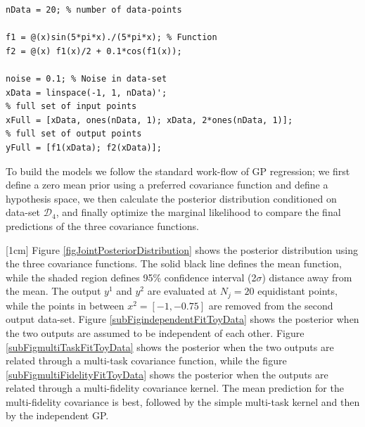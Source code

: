 \begin{mdframed}[hidealllines=true,backgroundcolor=lightgray!20]
\begin{lstlisting}[caption={Code for data-set D4}, 
                    captionpos=b,
                    label={codeDatasetD4},
                    style=Matlab-editor, 
                    basicstyle=\color{black}\ttfamily\small,
                    backgroundcolor = \color{MatlabCellColour}]
nData = 20; % number of data-points

f1 = @(x)sin(5*pi*x)./(5*pi*x); % Function
f2 = @(x) f1(x)/2 + 0.1*cos(f1(x));

noise = 0.1; % Noise in data-set
xData = linspace(-1, 1, nData)';
% full set of input points
xFull = [xData, ones(nData, 1); xData, 2*ones(nData, 1)]; 
% full set of output points
yFull = [f1(xData); f2(xData)];
\end{lstlisting}
\end{mdframed}

\begin{mdframed}[hidealllines=true,backgroundcolor=lightgray!20]
To build the models we follow the standard work-flow of GP regression; we first define a zero mean prior using a preferred covariance function and define a hypothesis space, we then calculate the posterior distribution conditioned on data-set $\mathcal{D}_{4}$, and finally optimize the marginal likelihood to compare the final predictions of the three covariance functions. 

[1cm]
Figure \ref{figJointPosteriorDistribution} shows the posterior distribution using the three covariance functions. The solid black line defines the mean function, while the shaded region defines 95\% confidence interval (2$\sigma$) distance away from the mean. The output $y^{1}$ and $y^2$ are evaluated at $N_{j}=20$ equidistant points, while the points in between $x^2 = [-1, -0.75]$ are removed from the second output data-set. Figure \ref{subFigindependentFitToyData} shows the posterior when the two outputs are assumed to be independent of each other. Figure \ref{subFigmultiTaskFitToyData} shows the posterior when the two outputs are related through a multi-task covariance function, while the figure \ref{subFigmultiFidelityFitToyData} shows the posterior when the outputs are related through a multi-fidelity covariance kernel. The mean prediction for the multi-fidelity covariance is best, followed by the simple multi-task kernel and then by the independent GP.
\end{mdframed}

